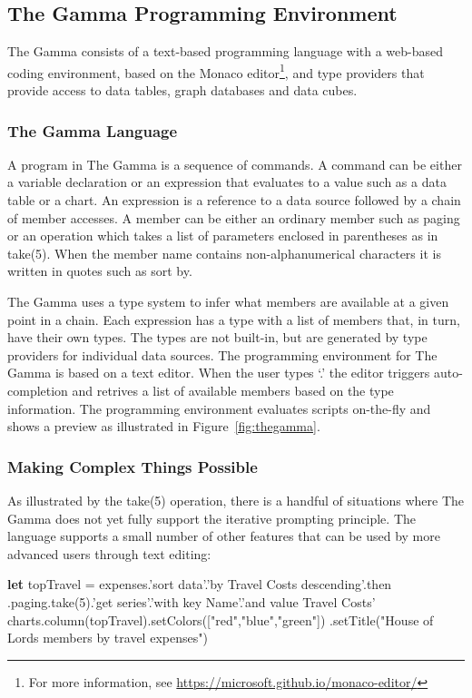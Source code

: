 \documentclass[manuscript,review,anonymous]{acmart}
\newcommand{\kvd}[1]{\textbf{#1}}
\newcommand{\ikvd}[1]{{\fontfamily{zi4}\selectfont\small #1}}
\begin{document}
\subsection{The Gamma Programming Environment}
\label{sec:overview-lang}

The Gamma consists of a text-based programming language with a web-based coding environment,
based on the Monaco editor\footnote{For more information, see \url{https://microsoft.github.io/monaco-editor/}},
and type providers that provide access to data tables, graph databases and data cubes.

\subsubsection*{The Gamma Language}
A program in The Gamma is a sequence of commands. A command can be either a variable declaration
or an expression that evaluates to a value such as a data table or a chart.
An expression is a reference to a data source followed by a chain of member accesses.
A member can be either an ordinary member such as \ikvd{paging} or an operation which takes a
list of parameters enclosed in parentheses as in \ikvd{take(5)}. When the member name contains
non-alphanumerical characters it is  written in quotes such as \ikvd{\textquotesingle sort by\textquotesingle}.

The Gamma uses a type system to infer what members are available at a given point in a chain.
Each expression has a type with a list of members that, in turn, have their own types.
The types are not built-in, but are generated by type providers for individual data sources.
The programming environment for The Gamma is based on a text editor. When the user types `.'
the editor triggers auto-completion and retrives a list of available members based on the type
information. The programming environment evaluates scripts on-the-fly and shows a preview as
illustrated in Figure~\ref{fig:thegamma}.

\subsubsection*{Making Complex Things Possible}
As illustrated by the \ikvd{take(5)} operation, there is a handful of situations where The
Gamma does not yet fully support the iterative prompting principle. The language supports
a small number of other features that can be used by more advanced users through text editing:

\vspace{0.3em}
\begin{thegamma}
\kvd{let} topTravel = expenses.'sort data'.'by Travel Costs descending'.then
  .paging.take(5).'get series'.'with key Name'.'and value Travel Costs'
charts.column(topTravel).setColors(["red","blue","green"])
  .setTitle("House of Lords members by travel expenses")
\end{thegamma}
\vspace{0.3em}
\end{document}
